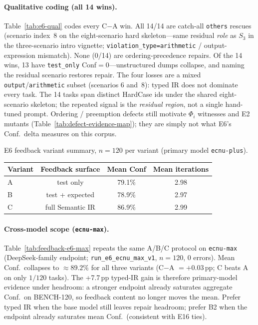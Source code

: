 





\paragraph{Qualitative coding (all 14 wins).}
Table~\ref{tab:e6-qual} codes every C$-$A win.
All 14/14 are catch-all \texttt{others} rescues (scenario index~8 on the
eight-scenario hard skeleton---same residual \emph{role} as $S_3$ in the
three-scenario intro vignette;
\texttt{violation\_type=arithmetic} / output-expression mismatch).
None (0/14) are ordering-precedence repairs.
Of the 14 wins, 13 have \texttt{test\_only} Conf${=}0$---unstructured dumps
collapse, and naming the residual scenario restores repair.
The four losses are a mixed \texttt{output}/\texttt{arithmetic} subset
(scenarios 6 and~8): typed IR does not dominate every task.
The 14 tasks span distinct HardCase ids under the shared eight-scenario
skeleton; the repeated signal is the \emph{residual region}, not a single
hand-tuned prompt.
Ordering / preemption defects still motivate $\Phi_i$ witnesses and E2
mutants (Table~\ref{tab:defect-evidence-map}); they are simply not what E6's
Conf.\ delta measures on this corpus.



\begin{inlinetable}{E6 feedback variant summary, $n=120$ per variant
  (primary model \texttt{ecnu-plus}).}
  \label{tab:feedback-e6}
  \begin{tabular}{lccc}
    \toprule
    Variant & Feedback surface & Mean Conf & Mean iterations \\
    \midrule
    A & test only           & 79.1\% & 2.98 \\
    B & test + expected     & 78.9\% & 2.97 \\
    C & full Semantic IR    & 86.9\% & 2.99 \\
    \bottomrule
  \end{tabular}
\end{inlinetable}

\paragraph{Cross-model scope (\texttt{ecnu-max}).}
Table~\ref{tab:feedback-e6-max} repeats the same A/B/C protocol on
\texttt{ecnu-max} (DeepSeek-family endpoint; \texttt{run\_e6\_ecnu\_max\_v1},
$n{=}120$, 0 errors).
Mean Conf.\ collapses to ${\approx}89.2\%$ for all three variants
(C$-$A ${=}{+}0.03$\,pp; C beats A on only $1/120$ tasks).
The +7.7\,pp typed-IR gain is therefore primary-model evidence under headroom:
a stronger endpoint already saturates aggregate Conf.\ on BENCH-120, so
feedback content no longer moves the mean.
Prefer typed IR when the base model still leaves repair headroom; prefer B2
when the endpoint already saturates mean Conf.\ (consistent with E16 ties).


